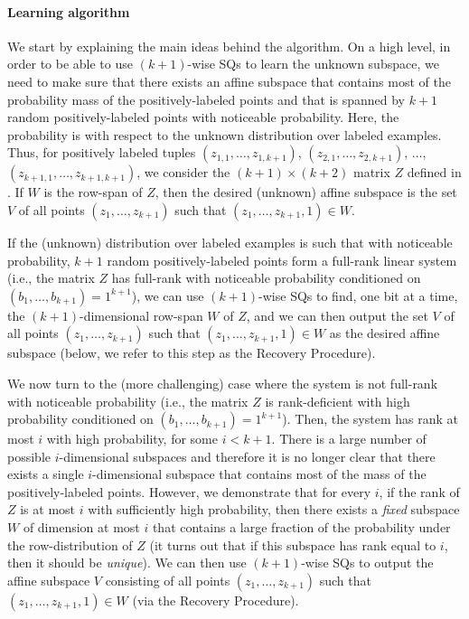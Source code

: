 \paragraph{Learning algorithm}
We start by explaining the main ideas behind the algorithm. On a high level, in order to be able to use $(k+1)$-wise SQs to learn the unknown subspace, we need to make sure that there exists an affine subspace that contains most of the probability mass of the positively-labeled points and
that is spanned by $k+1$ random positively-labeled points with noticeable probability. Here, the probability is with respect to the unknown distribution over labeled examples. Thus, for positively labeled tuples $(z_{1,1}, \dots, z_{1,k+1})$, $(z_{2,1}, \dots, z_{2,k+1})$, $\dots$, $(z_{k+1,1}, \dots, z_{k+1,k+1})$, we  consider the $(k+1) \times (k+2)$ matrix $Z$ defined in . If $W$ is the row-span of $Z$, then the desired (unknown) affine subspace is the set $V$ of all points $(z_1, \dots,z_{k+1})$ such that $(z_1, \dots,z_{k+1}, 1) \in W$.
	
	
	If the (unknown) distribution over labeled examples is such that with noticeable probability, $k+1$ random positively-labeled points form a full-rank linear system (i.e., the matrix $Z$ has full-rank with noticeable probability conditioned on $(b_1,\dots,b_{k+1}) = 1^{k+1}$), we can use $(k+1)$-wise SQs to find, one bit at a time, the $(k+1)$-dimensional row-span $W$ of $Z$, and we can then output the set $V$ of all points $(z_1, \dots,z_{k+1})$ such that $(z_1, \dots,z_{k+1}, 1) \in W$ as the desired affine subspace (below, we refer to this step as the Recovery Procedure).
		
	 We now turn to the (more challenging) case where the system is not full-rank with noticeable probability (i.e., the matrix $Z$ is rank-deficient with high probability conditioned on $(b_1,\dots,b_{k+1}) = 1^{k+1}$). Then, the system has rank at most $i$ with high probability, for some $i < k+1$. There is a large number of possible $i$-dimensional subspaces and therefore it is no longer clear that there exists a single $i$-dimensional subspace that contains most of the mass of the positively-labeled points. However, we demonstrate that for every $i$, if the rank of $Z$ is at most $i$ with sufficiently high probability, then there exists a \emph{fixed} subspace $W$ of dimension at most $i$ that contains a large fraction of the probability under the row-distribution of $Z$ (it turns out that if this subspace has rank equal to $i$, then it should be \emph{unique}). We can then use $(k+1)$-wise SQs to output the affine subspace $V$ consisting of all points $(z_1,\dots,z_{k+1})$ such that $(z_1,\dots,z_{k+1},1) \in W$ (via the Recovery Procedure).


